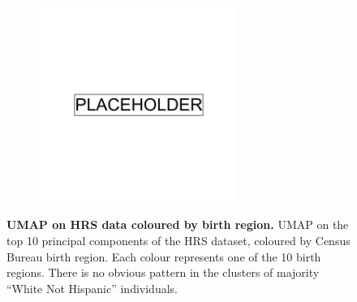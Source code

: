 \begin{figure}[ht]
    \centering
    \begin{subfigure}{\textwidth}
    \includegraphics[width=0.7\textwidth]{placeholder.png}
    \end{subfigure}
    \caption[UMAP on HRS data coloured by birth region]{\textbf{UMAP on HRS data coloured by birth region.} UMAP on the top 10 principal components of the HRS dataset, coloured by Census Bureau birth region. Each colour represents one of the 10 birth regions. There is no obvious pattern in the clusters of majority ``White Not Hispanic'' individuals.}
    \label{fig:supp_hrs_born}
\end{figure}

\newpage

